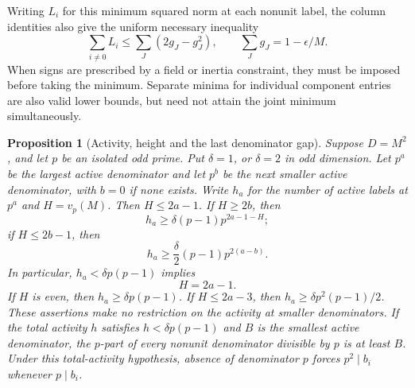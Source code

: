 \documentclass[11pt]{amsart}
\numberwithin{equation}{section}
\newtheorem{proposition}[theorem]{Proposition}
\theoremstyle{definition}
\theoremstyle{plain}
\begin{document}
Writing $L_i$ for this minimum squared norm at each nonunit label,
the column identities also give the uniform necessary inequality
\[
 \sum_{i\ne0}L_i\le
 \sum_J(2g_J-g_J^2),\qquad
 \sum_Jg_J=1-\epsilon/M.
\]
When signs are prescribed by a field or inertia constraint, they
must be imposed before taking the minimum. Separate minima for
individual component entries are also valid lower bounds, but
need not attain the joint minimum simultaneously.

\begin{proposition}[Activity, height and the last denominator gap]
\label{new:activity-height-gap}\label{new:sparse-component-floor}
Suppose $D=M^2$, and let $p$ be an isolated odd prime.
Put $\delta=1$, or $\delta=2$ in odd dimension.
Let $p^a$ be the largest active denominator and let $p^b$ be
the next smaller active denominator, with $b=0$ if none exists.
Write $h_a$ for the number of active labels at $p^a$ and
$H=v_p(M)$. Then $H\le2a-1$. If $H\ge2b$, then
\[
                  h_a\ge\delta(p-1)p^{2a-1-H};
\]
if $H\le2b-1$, then
\[
                  h_a\ge\frac\delta2(p-1)p^{2(a-b)}.
\]
In particular, $h_a<\delta p(p-1)$ implies
\begin{equation}\label{eq:sparse-height}H=2a-1.\end{equation}
If $H$ is even, then $h_a\ge\delta p(p-1)$.
If $H\le2a-3$, then $h_a\ge\delta p^2(p-1)/2$.
These assertions make no restriction on the activity at smaller
denominators. If the total activity $h$ satisfies
$h<\delta p(p-1)$ and $B$ is the smallest active denominator,
the $p$-part of every nonunit denominator divisible by $p$
is at least $B$. Under this total-activity hypothesis, absence of denominator $p$
forces $p^2\mid b_i$ whenever $p\mid b_i$.
\end{proposition}
\end{document}
